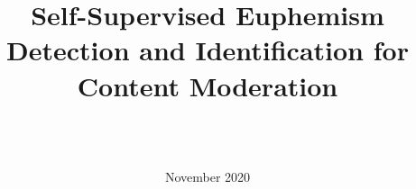 \newif\ifanonymized\anonymizedtrue  %
\newif\ifroughdraft\roughdraftfalse  %
\newif\ifdraft\drafttrue  %



\graphicspath{{figures/}}

\ifdraft
\newcommand{\kibitz}[3]
{\textcolor[HTML]{#1}{[\textbf{#2}\ifx&#3&\else: \textit{#3}\fi]}}
\else
\newcommand{\kibitz}[3]{}
\fi

\newcommand{\todo}[1]{\kibitz{e7298a}{TODO}{#1}}
\newcommand{\needcite}[1]{\kibitz{e7298a}{citation needed}{#1}}
\newcommand{\needxref}[1]{\kibitz{e7298a}{xref needed}{#1}}


\newcommand{\GF}[1]{\kibitz{1b9e77}{GF}{#1}}
\newcommand{\NC}[1]{\kibitz{d95f02}{NC}{#1}}
\newcommand{\SB}[1]{\kibitz{7570b3}{SB}{#1}}
\newcommand{\WZ}[1]{\kibitz{66a61e}{WZ}{#1}}
\newcommand{\ZW}[1]{\kibitz{e6ab02}{ZW}{#1}}

\let\needref=\needxref
\let\nicolasc=\NC


\title{Self-Supervised Euphemism Detection and Identification for Content Moderation}
\author{%
	\ifanonymized
	\\ \\
	\else
	\IEEEauthorblockN{Wanzheng Zhu}
	\IEEEauthorblockA{University of Illinois at Urbana-Champaign}
	\and
	\IEEEauthorblockN{Hongyu Gong}
	\IEEEauthorblockA{Facebook}
	\and
	\IEEEauthorblockN{Rohan Bansal}
	\IEEEauthorblockA{Carnegie Mellon University}
	\and
	\IEEEauthorblockN{Zachary Weinberg}
	\IEEEauthorblockA{University of Massachusetts, Amherst}
	\and
	\IEEEauthorblockN{Suma Bhat}
	\IEEEauthorblockA{University of Illinois at Urbana-Champaign}
	\and
	\IEEEauthorblockN{Giulia Fanti}
	\IEEEauthorblockA{Carnegie Mellon University}
	\and
	\IEEEauthorblockN{Nicolas Christin}
	\IEEEauthorblockA{Carnegie Mellon University}
	\fi}
\date{November 2020}


